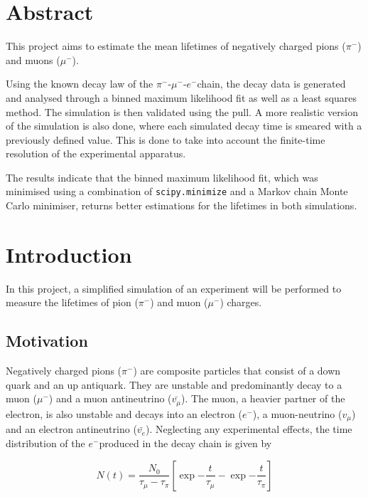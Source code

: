 \documentclass[11pt, a4paper, oneside]{book}
\newcommand{\electron}{$e^{-}$}
\newcommand{\pion}{$\pi^{-}$}
\newcommand{\muon}{$\mu^{-}$}
\begin{document}


\tableofcontents

\chapter{Abstract}
This project aims to estimate the mean lifetimes of negatively charged pions (\pion) and muons (\muon). 

Using the known decay law of the \pion-\muon-\electron chain, the decay data is generated and analysed through a binned maximum likelihood fit as well as a least squares method. The simulation is then validated using the pull. A more realistic version of the simulation is also done, where each simulated decay time is smeared with a previously defined value. This is done to take into account the finite-time resolution of the experimental apparatus.

The results indicate that the binned maximum likelihood fit, which was minimised using a combination of \lstinline{scipy.minimize} and a Markov chain Monte Carlo minimiser, returns better estimations for the lifetimes in both simulations. 


\chapter{Introduction}
In this project, a simplified simulation of an experiment will be performed to measure the lifetimes of pion (\pion) and muon (\muon) charges.

\section{Motivation}
Negatively charged pions (\pion) are composite particles that consist of a down quark and an up antiquark. They are unstable and predominantly decay to a muon (\muon) and a muon antineutrino ($\bar{v_{\mu}}$). The muon, a heavier partner of the electron, is also unstable and decays into an electron (\electron), a muon-neutrino ($v_{\mu}$) and an electron antineutrino ($\bar{v_{e}}$). Neglecting any experimental effects, the time distribution of the \electron produced in the decay chain is given by

\begin{equation}
    N(t) = \frac{N_0}{\tau_{\mu} - \tau_{\pi}}  \left[ \exp{-\frac{t}{\tau_{\mu}}} - \exp{-\frac{t}{\tau_{\pi}}} \right]
    \label{eq:decay_chain_equation}
\end{equation}
\end{document}
